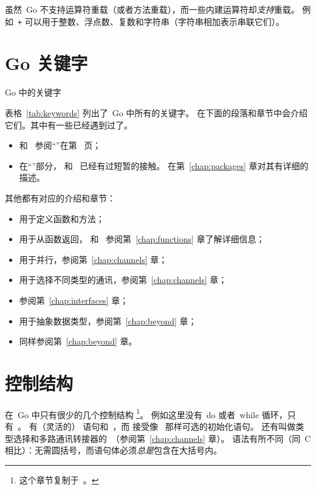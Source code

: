 虽然~Go 不支持运算符重载（或者方法重载），而一些内建运算符却\emph{支持}重载。
例如~\texttt{+} 可以用于整数、浮点数、复数和字符串（字符串相加表示串联它们）。

\section{Go 关键字}
\begin{table}[H]
\begin{center}
\caption{Go 中的关键字}
\label{tab:keywords}

\end{center}
\end{table}
表格~\ref{tab:keywords} 列出了~Go 中所有的关键字。
在下面的段落和章节中会介绍它们。其中有一些已经遇到过了。
\begin{itemize}
\item {} 和~ 参阅``''在第~\pageref{sec:vars} 页；
\item 在``''部分， 和~ 已经有过短暂的接触。 
在第~\ref{chap:packages} 章对其有详细的描述。
\end{itemize}
其他都有对应的介绍和章节：
\begin{itemize}
\item {} 用于定义函数和方法；
\item {} 用于从函数返回， 和~
参阅第~\ref{chap:functions} 章了解详细信息；
\item {} 用于并行，参阅第~\ref{chap:channels} 章；
\item {} 用于选择不同类型的通讯，参阅第~\ref{chap:channels} 章；
\item {} 参阅第~\ref{chap:interfaces} 章；
\item {} 用于抽象数据类型，参阅第~\ref{chap:beyond} 章；
\item {} 同样参阅第~\ref{chap:beyond} 章。
\end{itemize}

\section{控制结构}
在~Go 中只有很少的几个控制结构
\footnote{这个章节复制于~\cite{effective_go}。}。
例如这里没有~do 或者~while 循环，只有~。
有（灵活的） 语句和~，而
 接受像~ 那样可选的初始化语句。
还有叫做类型选择和多路通讯转接器的~（参阅第~\ref{chap:channels} 章）。
语法有所不同（同~C 相比）：无需圆括号，而语句体必须\emph{总是}包含在大括号内。

